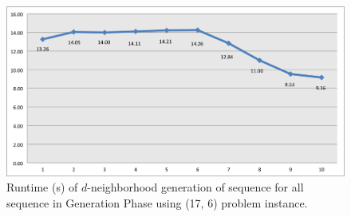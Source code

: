 \begin{figure}[h]
	\centering
	\includegraphics[width=4.5in]{contents/00_images/bf-sequence-runtime}
	\caption{Runtime (s) of $d$-neighborhood generation of sequence for all sequence in Generation Phase using (17, 6) problem instance.}
	\label{fig:bf-per-sequence-runtime}
\end{figure} 